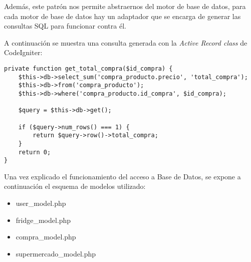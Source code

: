         Además, este patrón nos permite abstraernos del motor de base de datos, para cada motor de base de datos hay un adaptador que se encarga de generar las consultas SQL para funcionar contra él.

        A continuación se muestra una consulta generada con la \emph{Active Record class} de CodeIgniter:

        \begin{lstlisting}
private function get_total_compra($id_compra) {
    $this->db->select_sum('compra_producto.precio', 'total_compra');
    $this->db->from('compra_producto');
    $this->db->where('compra_producto.id_compra', $id_compra);

    $query = $this->db->get();

    if ($query->num_rows() === 1) {
        return $query->row()->total_compra;
    }
    return 0;
}
        \end{lstlisting}

        Una vez explicado el funcionamiento del acceso a Base de Datos, se expone a continuación el esquema de modelos utilizado:

        \begin{itemize}
            \item user\_model.php
            \item fridge\_model.php
            \item compra\_model.php
            \item supermercado\_model.php
        \end{itemize}